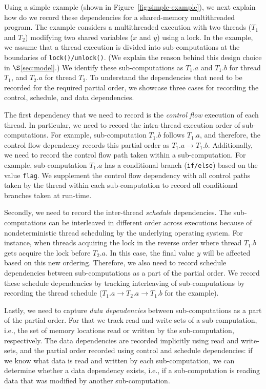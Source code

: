  Using a simple example (shown in Figure~\ref{fig:simple-example}), we next explain how do we record these dependencies for a shared-memory multithreaded program. The example considers a multithreaded execution with two threads ($T_1$ and $T_2$) modifying two shared variables ($x$ and $y$) using a lock. In the example, we assume that a thread execution is divided into sub-computations at the boundaries of {\tt lock()/unlock()}. (We explain the reason behind this design choice in $\S$\ref{sec:model}.) We identify these sub-computations as $T_1.a$ and $T_1.b$ for thread $T_1$, and $T_2.a$ for thread $T_2$.   To understand the dependencies that need to be recorded for the required partial order, we showcase three cases for recording the control, schedule, and data dependencies.

The first dependency that we need to record is the {\em control flow} execution of each thread. In particular, we need to record the intra-thread execution order of sub-computations. For example, sub-computation $T_1.b$ follows $T_1.a$, and therefore, the control flow dependency records this partial order as $T_1.a \rightarrow T_1.b$. Additionally, we need to record the control flow path taken within a sub-computation. For example, sub-computation  $T_1.a$ has a conditional branch ({\tt if/else}) based on the value {\tt flag}. We supplement the control flow dependency with all control paths taken by the thread within each sub-computation to record all conditional branches taken at run-time.

Secondly, we need to record the inter-thread {\em schedule} dependencies. The sub-computations can be interleaved in different order across executions because of nondeterministic thread scheduling by the underlying operating system. For instance, when threads acquiring the lock in the reverse order where thread $T_1.b$ gets acquire the lock before $T_2.a$. In this case, the final value $y$ will be affected based on this new ordering. Therefore, we also need to record schedule dependencies between sub-computations as a part of the partial order. We record these schedule dependencies by tracking interleaving of sub-computations by recording the thread schedule ($T_1.a   \rightarrow   T_2.a \rightarrow T_1.b $ for the example).

Lastly,   we need to capture {\em data dependencies} between sub-computations as a part of the partial order. For that we track read and write sets of a sub-computation, i.e., the set of memory locations read or written by the sub-computation, respectively. The data dependencies are recorded implicitly using read and write-sets, and the partial order recorded using control and schedule dependencies: if we know what data is read and written by each sub-computation, we can determine whether a data dependency exists, i.e., if a sub-computation is reading data that was modified by another sub-computation. 


